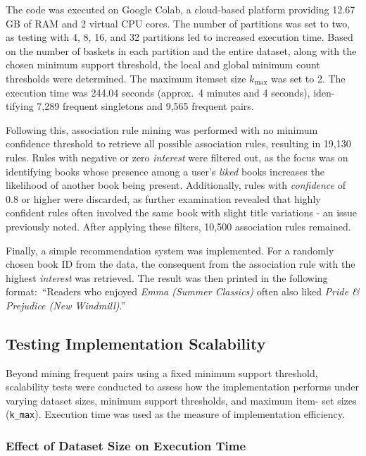 \documentclass{Class/julia}
\begin{document}
The code was executed on Google Colab, a cloud-based platform providing 12.67 GB of RAM and 2 virtual CPU cores. The number of partitions was set to two, as testing with 4, 8, 16, and 32 partitions led to increased execution time. Based on the number of baskets in each partition and the entire dataset, along with the chosen minimum support threshold, the local and global minimum count thresholds were determined. The maximum itemset size \( k_{\max} \) was set to 2. The execution time was 244.04 seconds (approx.\ 4 minutes and 4 seconds), iden- tifying 7,289 frequent singletons and 9,565 frequent pairs.

Following this, association rule mining was performed with no minimum confidence threshold to retrieve all possible association rules, resulting in 19,130 rules. Rules with negative or zero \textit{interest} were filtered out, as the focus was on identifying books whose presence among a user's \textit{liked} books increases the likelihood of another book being present. Additionally, rules with \textit{confidence} of 0.8 or higher were discarded, as further examination revealed that highly confident rules often involved the same book with slight title variations - an issue previously noted. After applying these filters, 10,500 association rules remained.

Finally, a simple recommendation system was implemented. For a randomly chosen book ID from the data, the consequent from the association rule with the highest \textit{interest} was retrieved. The result was then printed in the following format:\ ``Readers who enjoyed \textit{Emma (Summer Classics)} often also liked \textit{Pride \& Prejudice (New Windmill)}.''

\subsection{Testing Implementation Scalability}

Beyond mining frequent pairs using a fixed minimum support threshold, scalability tests were conducted to assess how the implementation performs under varying dataset sizes, minimum support thresholds, and maximum item- set sizes (\texttt{k\_max}). Execution time was used as the measure of implementation efficiency.

\subsubsection{Effect of Dataset Size on Execution Time}
\end{document}
